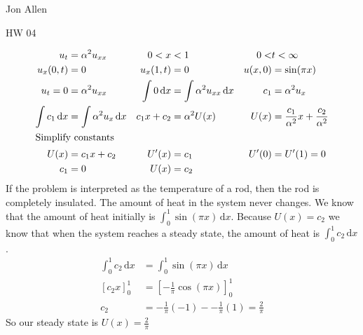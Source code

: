 \documentclass{article}
\begin{document}
Jon Allen

HW 04

\begin{align*}
  u_t&=\alpha^2u_{xx} & 0<x&<1 & 0<&t<\infty\\
  u_x(0,t)&=0 & u_x(1,t)&=0 & u(x,0)&=\sin(\pi x)\\
  u_t=0&=\alpha^2u_{xx} &
  \int{0\,\mathrm{d}x}&=\int{\alpha^2u_{xx}\,\mathrm{d}x} &
  c_1&=\alpha^2u_x\\
  \int{c_1\,\mathrm{d}x}&=\int{\alpha^2u_{x}\,\mathrm{d}x} &
  c_1x+c_2&=\alpha^2U(x) &
  U(x)&=\frac{c_1}{\alpha^2}x+\frac{c_2}{\alpha^2} \\
  \intertext{Simplify constants}
  U(x)&=c_1x+c_2 & U'(x)&=c_1 & U'(0)&=U'(1)=0\\
  c_1&=0 & U(x)&=c_2
\end{align*}
If the problem is interpreted as the temperature of a rod, then the rod is completely insulated. The amount of heat in the system never changes. We know that the amount of heat initially is $\int_0^1{\sin(\pi x)\,\mathrm{d}x}$.
Because $U(x)=c_2$ we know that when the system reaches a steady state, the amount of heat is $\int_0^1{c_2\,\mathrm{d}x}$.
\begin{align*}
  \int_0^1{c_2\,\mathrm{d}x}&=\int_0^1{\sin(\pi x)\,\mathrm{d}x}\\
  \left[c_2x\right]_0^1&=\left[-\frac{1}{\pi}\cos(\pi x)\right]_0^1\\
  c_2&=-\frac{1}{\pi}(-1)--\frac{1}{\pi}(1)=\frac{2}{\pi}
\end{align*}
So our steady state is $U(x)=\frac{2}{\pi}$
\end{document}
